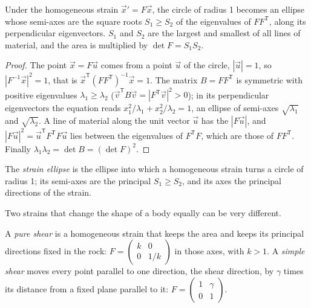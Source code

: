 \begin{proposition}\label{prop:b1:stress-strain-rheology:ellipse}
Under the homogeneous strain $\vec x' = F\vec x$, the circle of radius 1
becomes an ellipse whose semi-axes are the square roots $S_1 \ge S_2$ of the
eigenvalues of $FF^{\mathsf T}$, along its perpendicular eigenvectors. $S_1$
and $S_2$ are the largest and smallest  of all lines of material,
and the area is multiplied by $\det F = S_1S_2$.
\end{proposition}

\begin{proof}
The point $\vec x = F\vec u$ comes from a point $\vec u$ of the circle,
$|\vec u| = 1$, so $|F^{-1}\vec x|^2 = 1$, that is
$\vec x^{\mathsf T}(FF^{\mathsf T})^{-1}\vec x = 1$. The matrix
$B = FF^{\mathsf T}$ is symmetric with positive eigenvalues $\lambda_1 \ge
\lambda_2$ ($\vec v^{\mathsf T}B\vec v = |F^{\mathsf T}\vec v|^2 > 0$); in its
perpendicular eigenvectors the equation reads
$x_1^2/\lambda_1 + x_2^2/\lambda_2 = 1$, an ellipse of semi-axes
$\sqrt{\lambda_1}$ and $\sqrt{\lambda_2}$. A line of material along the unit
vector $\vec u$ has the  $|F\vec u|$, and
$|F\vec u|^2 = \vec u^{\mathsf T}F^{\mathsf T}F\vec u$ lies between the
eigenvalues of $F^{\mathsf T}F$, which are those of $FF^{\mathsf T}$. Finally
$\lambda_1\lambda_2 = \det B = (\det F)^2$.
\end{proof}

\begin{definition}\label{def:b1:stress-strain-rheology:strain-ellipse}
The \emph{strain ellipse} is the ellipse into which a
homogeneous strain turns a circle of radius 1; its semi-axes are the
principal  $S_1 \ge S_2$, and its axes the principal directions of
the strain.
\end{definition}

Two strains that change the shape of a body equally can be very different.

\begin{definition}\label{def:b1:stress-strain-rheology:shear-types}
A \emph{pure shear} is a homogeneous strain that keeps the
area and keeps its principal directions fixed in the rock:
$F = \begin{pmatrix} k & 0 \\ 0 & 1/k\end{pmatrix}$ in those axes, with
$k > 1$. A \emph{simple shear} moves every point parallel
to one direction, the shear direction, by $\gamma$ times its distance from a
fixed plane parallel to it:
$F = \begin{pmatrix} 1 & \gamma \\ 0 & 1\end{pmatrix}$.
\end{definition}

